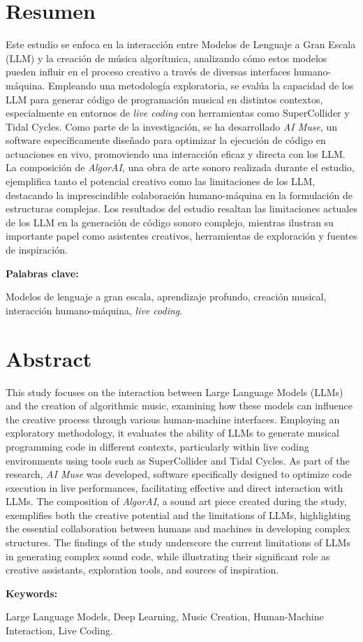   \clearpage
  \chapter*{Resumen}

  Este estudio se enfoca en la interacción entre Modelos de Lenguaje a Gran Escala (LLM) y la creación de música algorítmica, analizando cómo estos modelos pueden influir en el proceso creativo a través de diversas interfaces humano-máquina. Empleando una metodología exploratoria, se evalúa la capacidad de los LLM para generar código de programación musical en distintos contextos, especialmente en entornos de \emph{live coding} con herramientas como SuperCollider y Tidal Cycles. Como parte de la investigación, se ha desarrollado \emph{AI Muse}, un software específicamente diseñado para optimizar la ejecución de código en actuaciones en vivo, promoviendo una interacción eficaz y directa con los LLM. La composición de \emph{AlgorAI}, una obra de arte sonoro realizada durante el estudio, ejemplifica tanto el potencial creativo como las limitaciones de los LLM, destacando la imprescindible colaboración humano-máquina en la formulación de estructuras complejas. Los resultados del estudio resaltan las limitaciones actuales de los LLM en la generación de código sonoro complejo, mientras ilustran su importante papel como asistentes creativos, herramientas de exploración y fuentes de inspiración.
  


  \vspace{1cm}
  \textbf{Palabras clave:} %

  Modelos de lenguaje a gran escala, aprendizaje profundo, creación musical, interacción humano-máquina, \emph{live coding}.


    \clearpage
    \chapter*{Abstract}
  
    This study focuses on the interaction between Large Language Models (LLMs) and the creation of algorithmic music, examining how these models can influence the creative process through various human-machine interfaces. Employing an exploratory methodology, it evaluates the ability of LLMs to generate musical programming code in different contexts, particularly within live coding environments using tools such as SuperCollider and Tidal Cycles. As part of the research, \emph{AI Muse} was developed, software specifically designed to optimize code execution in live performances, facilitating effective and direct interaction with LLMs. The composition of \emph{AlgorAI}, a sound art piece created during the study, exemplifies both the creative potential and the limitations of LLMs, highlighting the essential collaboration between humans and machines in developing complex structures. The findings of the study underscore the current limitations of LLMs in generating complex sound code, while illustrating their significant role as creative assistants, exploration tools, and sources of inspiration.

    
    \vspace{1cm}
    \textbf{Keywords:} %
    
    Large Language Models, Deep Learning, Music Creation, Human-Machine Interaction, Live Coding.
  